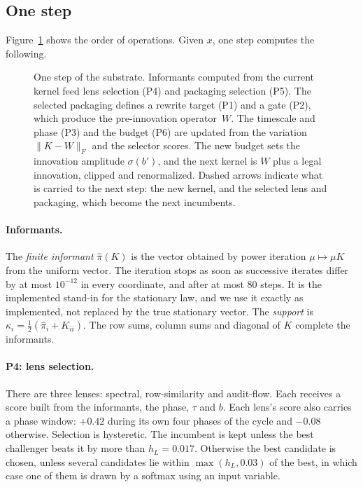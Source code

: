 \subsection{One step}

Figure~\ref{fig:update-loop} shows the order of operations. Given $x$, one step computes the following.

\begin{figure}[t]
\centering

\caption{One step of the substrate. Informants computed from the current kernel feed lens selection (P4) and packaging selection (P5). The selected packaging defines a rewrite target (P1) and a gate (P2), which produce the pre-innovation operator~$W$. The timescale and phase (P3) and the budget (P6) are updated from the variation $\lVert K-W\rVert_F$ and the selector scores. The new budget sets the innovation amplitude $\sigma(b')$, and the next kernel is $W$ plus a legal innovation, clipped and renormalized. Dashed arrows indicate what is carried to the next step: the new kernel, and the selected lens and packaging, which become the next incumbents.}
\label{fig:update-loop}
\end{figure}

\paragraph{Informants.}
The \emph{finite informant} $\hat\pi(K)$ is the vector obtained by power iteration $\mu\mapsto\mu K$ from the uniform vector. The iteration stops as soon as successive iterates differ by at most $10^{-12}$ in every coordinate, and after at most $80$ steps. It is the implemented stand-in for the stationary law, and we use it exactly as implemented, not replaced by the true stationary vector. The \emph{support} is $\kappa_i=\tfrac12(\hat\pi_i+K_{ii})$. The row sums, column sums and diagonal of $K$ complete the informants.

\paragraph{P4: lens selection.}
There are three lenses: spectral, row-similarity and audit-flow. Each receives a score built from the informants, the phase, $\tau$ and $b$. Each lens's score also carries a phase window: $+0.42$ during its own four phases of the cycle and $-0.08$ otherwise. Selection is hysteretic. The incumbent is kept unless the best challenger beats it by more than $h_L=0.017$. Otherwise the best candidate is chosen, unless several candidates lie within $\max(h_L,0.03)$ of the best, in which case one of them is drawn by a softmax using an input variable.

